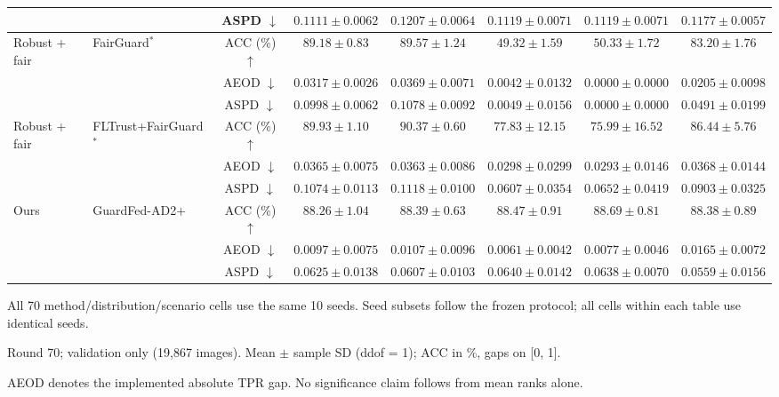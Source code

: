 \begin{table}[t]
{\begin{tabular}{l|l|c|ccccc}
 &  & ASPD $\downarrow$ & $0.1111 \pm 0.0062$ & $0.1207 \pm 0.0064$ & $0.1119 \pm 0.0071$ & $0.1119 \pm 0.0071$ & $0.1177 \pm 0.0057$ \\
\hline
\multirow{3}{*}{Robust + fair} & \multirow{3}{*}{FairGuard$^{*}$} & ACC (\%) $\uparrow$ & $89.18 \pm 0.83$ & $89.57 \pm 1.24$ & $49.32 \pm 1.59$ & $50.33 \pm 1.72$ & $83.20 \pm 1.76$ \\
 &  & AEOD $\downarrow$ & $0.0317 \pm 0.0026$ & $0.0369 \pm 0.0071$ & $0.0042 \pm 0.0132$ & $0.0000 \pm 0.0000$ & $0.0205 \pm 0.0098$ \\
 &  & ASPD $\downarrow$ & $0.0998 \pm 0.0062$ & $0.1078 \pm 0.0092$ & $0.0049 \pm 0.0156$ & $0.0000 \pm 0.0000$ & $0.0491 \pm 0.0199$ \\
\hline
\multirow{3}{*}{Robust + fair} & \multirow{3}{*}{FLTrust+FairGuard$^{*}$} & ACC (\%) $\uparrow$ & $89.93 \pm 1.10$ & $90.37 \pm 0.60$ & $77.83 \pm 12.15$ & $75.99 \pm 16.52$ & $86.44 \pm 5.76$ \\
 &  & AEOD $\downarrow$ & $0.0365 \pm 0.0075$ & $0.0363 \pm 0.0086$ & $0.0298 \pm 0.0299$ & $0.0293 \pm 0.0146$ & $0.0368 \pm 0.0144$ \\
 &  & ASPD $\downarrow$ & $0.1074 \pm 0.0113$ & $0.1118 \pm 0.0100$ & $0.0607 \pm 0.0354$ & $0.0652 \pm 0.0419$ & $0.0903 \pm 0.0325$ \\
\hline
\multirow{3}{*}{Ours} & \multirow{3}{*}{GuardFed-AD2+} & ACC (\%) $\uparrow$ & $88.26 \pm 1.04$ & $88.39 \pm 0.63$ & $88.47 \pm 0.91$ & $88.69 \pm 0.81$ & $88.38 \pm 0.89$ \\
 &  & AEOD $\downarrow$ & $0.0097 \pm 0.0075$ & $0.0107 \pm 0.0096$ & $0.0061 \pm 0.0042$ & $0.0077 \pm 0.0046$ & $0.0165 \pm 0.0072$ \\
 &  & ASPD $\downarrow$ & $0.0625 \pm 0.0138$ & $0.0607 \pm 0.0103$ & $0.0640 \pm 0.0142$ & $0.0638 \pm 0.0070$ & $0.0559 \pm 0.0156$ \\
\hline\hline
\end{tabular}}
\par\smallskip
\begin{minipage}{\textwidth}\scriptsize
All 70 method/distribution/scenario cells use the same 10 seeds. Seed subsets follow the frozen protocol; all cells within each table use identical seeds.\par
Round 70; validation only (19,867 images). Mean $\pm$ sample SD (ddof = 1); ACC in \%, gaps on [0, 1].\par
AEOD denotes the implemented absolute TPR gap. No significance claim follows from mean ranks alone.\par

\end{minipage}
\end{table}
